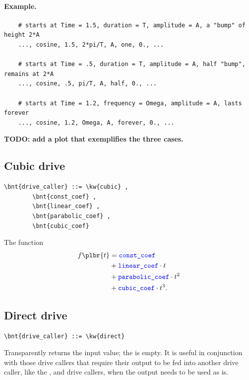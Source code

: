 \paragraph{Example.}
\begin{verbatim}
    # starts at Time = 1.5, duration = T, amplitude = A, a "bump" of height 2*A
    ..., cosine, 1.5, 2*pi/T, A, one, 0., ...

    # starts at Time = .5, duration = T, amplitude = A, half "bump", remains at 2*A
    ..., cosine, .5, pi/T, A, half, 0., ...

    # starts at Time = 1.2, frequency = Omega, amplitude = A, lasts forever
    ..., cosine, 1.2, Omega, A, forever, 0., ...
\end{verbatim}

\textbf{TODO: add a plot that exemplifies the three cases.}

\subsection{Cubic drive}
\begin{Verbatim}[commandchars=\\\{\}]
    \bnt{drive_caller} ::= \kw{cubic} ,
        \bnt{const_coef} , 
        \bnt{linear_coef} ,
        \bnt{parabolic_coef} , 
        \bnt{cubic_coef}
\end{Verbatim}
The function
\begin{align}
	f\plbr{t} &= \nt{const\_coef} \nonumber \\
		&+ \nt{linear\_coef} \cdot t \nonumber \\
		&+ \nt{parabolic\_coef} \cdot t^2 \nonumber \\
		&+ \nt{cubic\_coef} \cdot t^3
	.
\end{align}

\subsection{Direct drive}
\begin{Verbatim}[commandchars=\\\{\}]
    \bnt{drive_caller} ::= \kw{direct}
\end{Verbatim}
Transparently returns the input value; the  is empty.
It is useful in conjunction with those drive callers
that require their output to be fed into another drive caller,
like the ,  and 
drive callers, when the output needs to be used as is.

